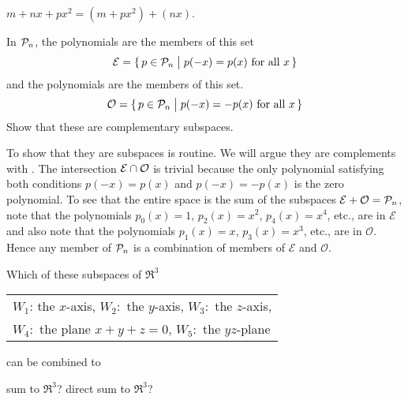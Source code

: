 \begin{exercises}
\begin{answer}
      \( m+nx+px^2=(m+px^2)+(nx) \).  
     \end{answer}
  \recommended \item 
    In \( \mathcal{P}_n \), the 
     polynomials are the members
    of this set
    \begin{equation*}
      \mathcal{E}=
      \mbox{$\{\,p\in\mathcal{P}_n \bigm| \text{\( p(-x)=p(x) \) for all \( x \)}\,\}$}
    \end{equation*}
    and the 
    polynomials are the members of this set.
    \begin{equation*}
      \mathcal{O}=
      \mbox{$\{\,p\in\mathcal{P}_n \bigm| \text{\( p(-x)=-p(x) \) 
                                              for all \( x \)}\,\}$}
    \end{equation*}
    Show that these are complementary subspaces.
    \begin{answer}
      To show that they are subspaces is routine.
      We will argue they are complements with .
      The intersection \( \mathcal{E}\cap\mathcal{O} \) is trivial
      because the only polynomial satisfying both conditions $p(-x)=p(x)$ and
      $p(-x)=-p(x)$ is the zero polynomial.
      To see that the entire space is the sum of the subspaces 
      \( \mathcal{E}+\mathcal{O}=\mathcal{P}_n \), 
      note that the polynomials
      \( p_0(x)=1 \), \( p_2(x)=x^2 \), \( p_4(x)=x^4 \), etc., are 
      in \( \mathcal{E} \) and also note that the polynomials
      \( p_1(x)=x \), \( p_3(x)=x^3 \), etc., are in \( \mathcal{O} \).
      Hence any member of \( \mathcal{P}_n \) is a combination of members of
      \( \mathcal{E} \) and \( \mathcal{O} \).  
    \end{answer}
  \item 
    Which of these subspaces of \( \Re^3 \) 
    \begin{center}
     \begin{tabular}{l}
      $W_1$: the \( x \)-axis,\quad
      $W_2$:~the \( y \)-axis,\quad
      $W_3$:~the \( z \)-axis,             \\
      $W_4$:~the plane \( x+y+z=0 \),\quad
      $W_5$:~the \( yz \)-plane
     \end{tabular}
    \end{center}
    can be combined to
    \begin{exparts*}
      \partsitem sum to \( \Re^3 \)? 
      \partsitem direct sum to \( \Re^3 \)?
    \end{exparts*}

\end{exercises}
